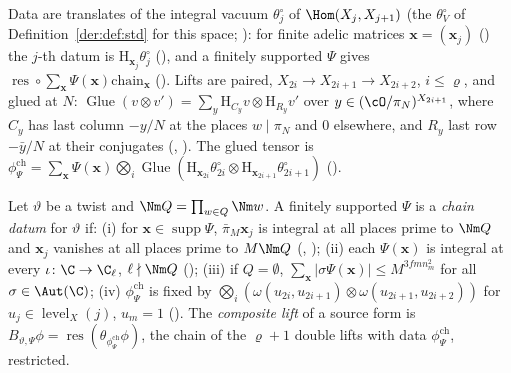 Data are translates of the integral vacuum $\theta^\circ_j$ of $\Hom(X_j,X_{j+1})$ (the $\theta^\circ_V$
of Definition~\ref{der:def:std} for this space; ): for finite adelic matrices $\mathbf x=(\mathbf x_j)$ ()
the $j$-th datum is $\mathrm H_{\mathbf x_j}\theta^\circ_j$ (), and a
finitely supported $\Psi$ gives $\operatorname{res}\circ\sum_{\mathbf x}\Psi(\mathbf x)\mathrm{chain}_{\mathbf x}$
(). Lifts are paired, $X_{2i}\to X_{2i+1}\to X_{2i+2}$, $i\le\varrho$,
and glued at $N$: $\operatorname{Glue}(v\otimes v')=\sum_y\mathrm H_{C_y}v\otimes\mathrm H_{R_y}v'$ over
$y\in(\cO/\pi_N)^{X_{2i+1}}$, where $C_y$ has last column $-y/N$ at the places $w\mid\pi_N$ and $0$
elsewhere, and $R_y$ last row $-\bar y/N$ at their conjugates (,
). The glued tensor is $\phi^{\mathrm{ch}}_\Psi=\sum_{\mathbf x}\Psi(\mathbf x)
\bigotimes_i\operatorname{Glue}(\mathrm H_{\mathbf x_{2i}}\theta^\circ_{2i}\otimes\mathrm H_{\mathbf x_{2i+1}}
\theta^\circ_{2i+1})$ ().

\begin{definition}
\label{ub-objects:def:chaindatum}
Let $\vartheta$ be a twist and $\Nm Q=\prod_{w\in Q}\Nm w$. A finitely supported $\Psi$ is a \emph{chain
datum} for $\vartheta$ if: (i) for $\mathbf x\in\operatorname{supp}\Psi$, $\bar\pi_M\mathbf x_j$ is integral at all
places prime to $\Nm Q$ and $\mathbf x_j$ vanishes at all places prime to $M\Nm Q$
(, ); (ii) each
$\Psi(\mathbf x)$ is integral at every $\iota\colon\C\to\C_\ell$, $\ell\nmid \Nm Q$
(); (iii) if $Q=\emptyset$, $\sum_{\mathbf x}|\sigma\Psi(\mathbf x)|\le M^{3fmn_m^2}$
for all $\sigma\in\Aut(\C)$; (iv) $\phi^{\mathrm{ch}}_\Psi$ is fixed by
$\bigotimes_i(\omega(u_{2i},u_{2i+1})\otimes\omega(u_{2i+1},u_{2i+2}))$ for $u_j\in
\operatorname{level}_X(j)$, $u_m=1$ (). The \emph{composite
lift} of a source form is $B_{\vartheta,\Psi}\phi=\operatorname{res}(\theta_{\phi^{\mathrm{ch}}_\Psi}
\phi)$, the chain of the $\varrho+1$ double lifts with data $\phi^{\mathrm{ch}}_\Psi$, restricted.
\end{definition}

